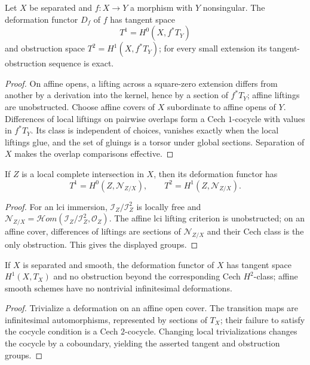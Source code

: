 \begin{theorem}\label{fga-the-6-4-12}
Let $X$ be separated and $f:X\to Y$ a morphism with $Y$ nonsingular.  The
deformation functor $D_f$ of $f$ has tangent space
\[
T^1=H^0(X,f^*T_Y)
\]
and obstruction space $T^2=H^1(X,f^*T_Y)$; for every small extension its
tangent-obstruction sequence is exact.
\end{theorem}
\begin{proof}
On affine opens, a lifting across a square-zero extension differs from another
by a derivation into the kernel, hence by a section of $f^*T_Y$; affine liftings
are unobstructed.  Choose affine covers of $X$ subordinate to affine opens of
$Y$.  Differences of local liftings on pairwise overlaps form a Cech $1$-cocycle
with values in $f^*T_Y$.  Its class is independent of choices, vanishes exactly
when the local liftings glue, and the set of gluings is a torsor under global
sections.  Separation of $X$ makes the overlap comparisons effective.
\end{proof}

\begin{proposition}\label{fga-pro-6-5-2}
If $Z$ is a local complete intersection in $X$, then its deformation functor has
\[
T^1=H^0(Z,\mathcal N_{Z/X}),\qquad
T^2=H^1(Z,\mathcal N_{Z/X}).
\]
\end{proposition}
\begin{proof}
For an lci immersion, $\mathcal I_Z/\mathcal I_Z^2$ is locally free and
$\mathcal N_{Z/X}=\mathcal H om(\mathcal I_Z/\mathcal I_Z^2,\mathcal O_Z)$.
The affine lci lifting criterion is unobstructed; on an affine cover, differences
of liftings are sections of $\mathcal N_{Z/X}$ and their Cech class is the only
obstruction.  This gives the displayed groups.
\end{proof}

\begin{remark}\label{fga-rem-6-5-3}\uses{}
If $X$ is separated and smooth, the deformation functor of $X$ has tangent
space $H^1(X,T_X)$ and no obstruction beyond the corresponding Cech
$H^2$-class; affine smooth schemes have no nontrivial infinitesimal deformations.
\end{remark}
\begin{proof}
Trivialize a deformation on an affine open cover.  The transition maps are
infinitesimal automorphisms, represented by sections of $T_X$; their failure to
satisfy the cocycle condition is a Cech $2$-cocycle.  Changing local
trivializations changes the cocycle by a coboundary, yielding the asserted
tangent and obstruction groups.
\end{proof}
